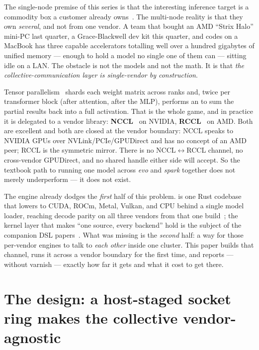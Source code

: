 \documentclass[11pt]{article}
\begin{document}
The single-node premise of this series is that the interesting inference target is a commodity box a
customer already owns~\cite{backend}. The multi-node reality is that they own \emph{several}, and not
from one vendor. A team that bought an AMD ``Strix Halo'' mini-PC last quarter, a Grace-Blackwell dev kit
this quarter, and codes on a MacBook has three capable accelerators totalling well over a hundred
gigabytes of unified memory --- enough to hold a model no single one of them can --- sitting idle on a
LAN. The obstacle is not the models and not the math. It is that \emph{the collective-communication
layer is single-vendor by construction}.

Tensor parallelism~\cite{megatron} shards each weight matrix across ranks and, twice per transformer
block (after attention, after the MLP), performs an  to sum the partial results back
into a full activation. That  is the whole game, and in practice it is delegated to a
vendor library: \textbf{NCCL}~\cite{nccl} on NVIDIA, \textbf{RCCL}~\cite{rccl} on AMD. Both are excellent
and both are closed at the vendor boundary: NCCL speaks to NVIDIA GPUs over NVLink/PCIe/GPUDirect and
has no concept of an AMD peer; RCCL is the symmetric mirror. There is no NCCL$\leftrightarrow$RCCL
channel, no cross-vendor GPUDirect, and no shared handle either side will accept. So the textbook path to
running one model across \emph{evo} and \emph{spark} together does not merely underperform --- it does
not exist.

The engine already dodges the \emph{first} half of this problem.  is one Rust codebase
that lowers to CUDA, ROCm, Metal, Vulkan, and CPU behind a single model loader, reaching 
decode parity on all three vendors from that one build~\cite{backend}; the kernel layer that makes ``one
source, every backend'' hold is the subject of the companion DSL papers~\cite{umbrella,fuse,oracle}. What
was missing is the \emph{second} half: a way for those per-vendor engines to talk to \emph{each other}
inside one cluster. This paper builds that channel, runs it across a vendor boundary for the first time,
and reports --- without varnish --- exactly how far it gets and what it cost to get there.

\section{The design: a host-staged socket ring makes the collective vendor-agnostic}
\label{sec:design}
\end{document}
